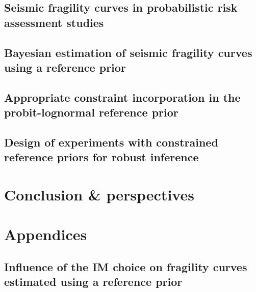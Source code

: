 \documentclass[a4paper]{book}
\begin{document}
\chapter{Seismic fragility curves in probabilistic risk assessment studies}\label{chap:frags-intro}




\chapter{Bayesian estimation of seismic fragility curves using a reference prior}\label{chap:prem}




\chapter{Appropriate constraint incorporation in the probit-lognormal reference prior%
}\label{chap:constrained-frags}




\chapter{Design of experiments with constrained reference priors for robust inference%
}\label{chap:doe}






\part{Conclusion \& perspectives}\label{part:conclusion}





\appendix
\part*{Appendices}\label{part:appendix}


\chapter{Influence of the IM choice on fragility curves estimated using a reference prior}\label{app:chap:uncecomp}
\end{document}
